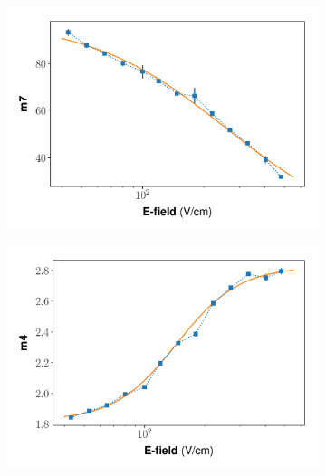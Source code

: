 \begin{figure}[h!]
\begin{subfigure}{0.45\textwidth}
  \caption{}
\end{subfigure}
\begin{subfigure}{0.45\textwidth}
  \centering
  \includegraphics[width=\textwidth]{Figures/Yields_fit_old/NEST_m7_fit_old_dcm.pdf}
  \caption{}
\end{subfigure}%
\begin{subfigure}{0.45\textwidth}
  \centering
  \includegraphics[width=\textwidth]{Figures/Yields_fit_old/NEST_m4_fit_old_dcm.pdf}
  \caption{}
\end{subfigure}
\begin{subfigure}{0.45\textwidth}
  \centering

\end{subfigure}
\end{figure}
